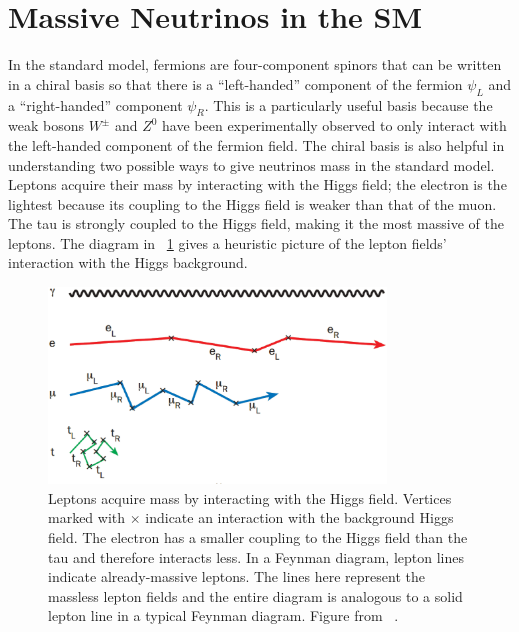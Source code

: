 \section{Massive Neutrinos in the SM}
\label{sec:mass}

In the standard model, fermions are four-component spinors that can be written in a chiral basis so that there is a ``left-handed'' component of the fermion $\psi_L$ and a ``right-handed'' component $\psi_R$.  This is a particularly useful basis because the weak bosons $W^{\pm}$ and $Z^0$ have been experimentally observed to only interact with the left-handed component of the fermion field.  The chiral basis is also helpful in understanding two possible ways to give neutrinos mass in the standard model.  Leptons acquire their mass by interacting with the Higgs field; the electron is the lightest because its coupling to the Higgs field is weaker than that of the muon.  The tau is strongly coupled to the Higgs field, making it the most massive of the leptons.  The diagram in {\fig}~\ref{fig:leptonMass} gives a heuristic picture of the lepton fields' interaction with the Higgs background.  
\begin{figure}[htp]
\centering
\includegraphics[width=0.8\textwidth]{figures/leptonMass.eps}
\caption[Lepton mass via the Higgs interaction.]{Leptons acquire mass by interacting with the Higgs field.  Vertices marked with $\times$ indicate an interaction with the background Higgs field.  The electron has a smaller coupling to the Higgs field than the tau and therefore interacts less.  In a Feynman diagram, lepton lines indicate already-massive leptons.  The lines here represent the  massless lepton fields and the entire diagram is analogous to a solid lepton line in a typical Feynman diagram.  Figure from {}~\citep{neutrinoMass}.}
\label{fig:leptonMass}
\end{figure}

